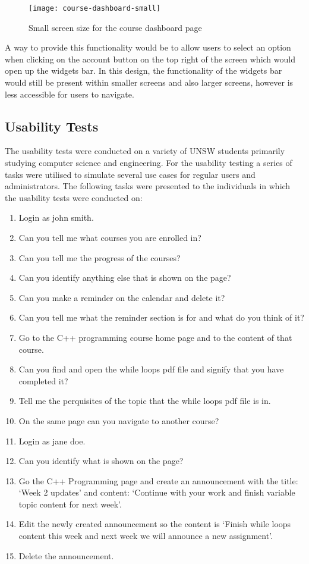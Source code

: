 \begin{figure}[h!]
    \centering
    \texttt{[image: course-dashboard-small]}
    \caption{Small screen size for the course dashboard page}
\end{figure}

A way to provide this functionality would be to allow users to select an option when clicking on the account button on the top right of the screen which would open up the widgets bar.
In this design, the functionality of the widgets bar would still be present within smaller screens and also larger screens, however is less accessible for users to navigate.

\subsection{Usability Tests}

The usability tests were conducted on a variety of UNSW students primarily studying computer science and engineering.
For the usability testing a series of tasks were utilised to simulate several use cases for regular users and administrators.
The following tasks were presented to the individuals in which the usability tests were conducted on:
\begin{enumerate}
    \item Login as john smith.
    \item Can you tell me what courses you are enrolled in?
    \item Can you tell me the progress of the courses?
    \item Can you identify anything else that is shown on the page?
    \item Can you make a reminder on the calendar and delete it?
    \item Can you tell me what the reminder section is for and what do you think of it?
    \item Go to the C++ programming course home page and to the content of that course.
    \item Can you find and open the while loops pdf file and signify that you have completed it?
    \item Tell me the perquisites of the topic that the while loops pdf file is in.
    \item On the same page can you navigate to another course?
    \item Login as jane doe.
    \item Can you identify what is shown on the page?
    \item Go the C++ Programming page and create an announcement with the title: ‘Week 2 updates’ and content: ‘Continue with your work and finish variable topic content for next week’.
    \item Edit the newly created announcement so the content is ‘Finish while loops content this week and next week we will announce a new assignment’.
    \item Delete the announcement.
\end{enumerate}

